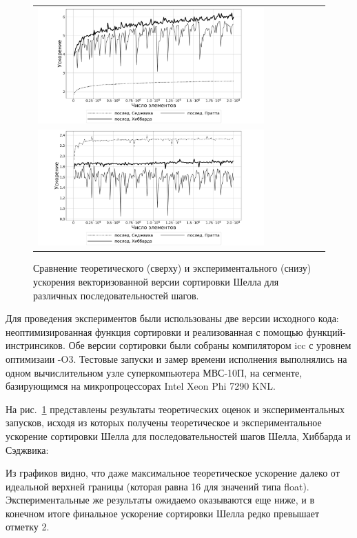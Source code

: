 \begin{figure}[ht]
\centering
\begin{tabular}{l}
\includegraphics[width=0.8\textwidth]{./pics/text_4_vec_irreg/theoretical_eff.pdf}
\\
\includegraphics[width=0.8\textwidth]{./pics/text_4_vec_irreg/experimental_eff.pdf}
\end{tabular}
\singlespacing
{}\caption{Сравнение теоретического (сверху) и экспериментального (снизу) ускорения векторизованной версии сортировки Шелла для различных последовательностей шагов.}
\label{fig:text_4_vec_irreg_eff}
\end{figure}

Для проведения экспериментов были использованы две версии исходного кода: неоптимизированная функция сортировки и реализованная с помощью функций-инстринсиков\label{term:intrinsic6}.
Обе версии сортировки были собраны компилятором icc с уровнем оптимизаии -O3.
Тестовые запуски и замер времени исполнения выполнялись на одном вычислительном узле суперкомпьютера МВС-10П, на сегменте, базирующимся на микропроцессорах Intel Xeon Phi 7290 KNL.

На рис.~\ref{fig:text_4_vec_irreg_eff} представлены результаты теоретических оценок и экспериментальных запусков, исходя из которых получены теоретическое и экспериментальное ускорение сортировки Шелла для последовательностей шагов Шелла, Хиббарда и Сэджвика:

Из графиков видно, что даже максимальное теоретическое ускорение далеко от идеальной верхней границы (которая равна 16 для значений типа float).
Экспериментальные же результаты ожидаемо оказываются еще ниже, и в конечном итоге финальное ускорение сортировки Шелла редко превышает отметку 2.

